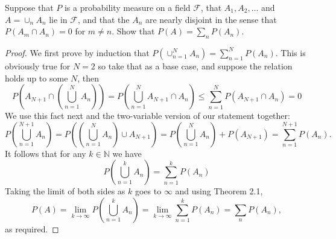 \documentclass[11pt]{article}
\newcommand{\N}{\mathbb{N}}
\newcommand{\F}{\mathcal{F}}
\newcommand{\mc}{\mathcal}
\newcommand{\ic}{\cap}
\newcommand{\Sum}{\sum\limits}
\newenvironment{exercise}[2][Exercise]{\begin{trivlist}
\item[\hskip \labelsep {\bfseries #1}\hskip \labelsep {\bfseries #2.}]}{\end{trivlist}}
\begin{document}
\begin{exercise}{2.17}
    Suppose that $P$ is a probability  measure on a field $\F$, that $A_1, A_2, \ldots$ and $A = \cup_n A_n$ lie in $\mc F$, and that the $A_n$ are nearly disjoint in the sense that $P(A_m \ic A_n) = 0$ for $m \neq n$. Show that $P(A) = \sum_n P(A_n)$.
\end{exercise}
\begin{proof}
    We first prove by induction that $P \left ( \cup_{n=1}^{N} A_n \right) = \sum_{n=1}^{N} P(A_n)$. This is obviously true for $N=2$ so take that as a base case, and suppose the relation holds up to some $N$, then
    \[ P \left (A_{N+1} \ic  \left (\bigcup_{n=1}^{N} A_n \right ) \right) = P \left ( \bigcup_{n=1}^{N} A_{N+1} \ic A_n \right ) \leq \sum_{n=1}^{N} P(A_{N+1} \ic A_n)  = 0 \]
    We use this fact next and the two-variable version of our statement together:
    \[ P \left (\bigcup_{n=1}^{N+1} A_n \right) = P \left ( \left (\bigcup_{n=1}^{N} A_n \right ) \cup A_{N+1} \right ) = P \left ( \bigcup_{n=1}^{N} A_n  \right ) + P(A_{N+1}) = \Sum_{n=1}^{N+1} P(A_n).  \]
    It follows that for any $k \in \N$ we have
    \[ P \left (\bigcup_{n=1}^{k} A_n \right) = \sum_{n=1}^{k} P(A_n) \]
    Taking the limit of both sides as $k$ goes to $\infty$ and using Theorem 2.1, 
    \[ P (A) = \lim_{k \to \infty} P \left (\bigcup_{n=1}^{k} A_n \right) =  \lim_{k \to \infty} \sum_{n=1}^{k} P(A_n) = \sum_n P(A_n), \]
    as required.
\end{proof}
\end{document}
